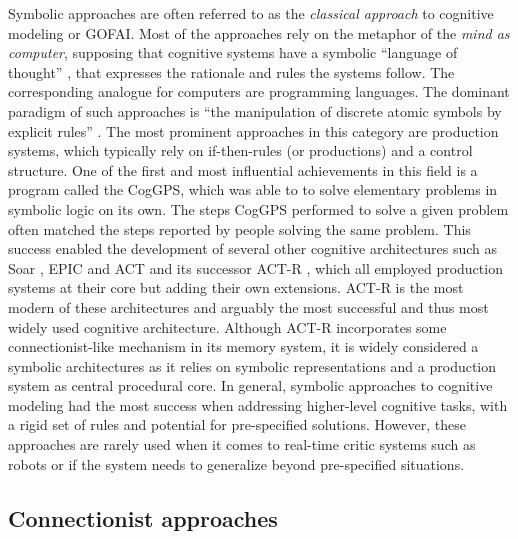 Symbolic approaches are often referred to as the \emph{classical approach} to cognitive modeling or \acf{GOFAI}.
Most of the approaches rely on the metaphor of the \emph{mind as computer}, supposing that cognitive systems have a symbolic \enquote{language of thought} \parencite{Fodor1975}, that expresses the rationale and rules the systems follow.
The corresponding analogue for computers are programming languages.
The dominant paradigm of such approaches is \enquote{the manipulation of discrete atomic symbols by explicit rules} \parencite{Levy2008}.
The most prominent approaches in this category are production systems, which typically rely on if-then-rules (or productions) and a control structure.
One of the first and most influential achievements in this field is a program called the \ac{CogGPS}, which was able to to solve elementary problems in symbolic logic on its own.
The steps \ac{CogGPS} performed to solve a given problem often matched the steps reported by people solving the same problem.
This success enabled the development of several other cognitive architectures such as Soar \parencite{Laird1987}, \ac{EPIC} \parencite{Kieras1997} and \ac{ACT} \parencite{Anderson1983} and its successor \ac{ACT-R} \parencite{Anderson1996}, which all employed production systems at their core but adding their own extensions.
\ac{ACT-R} is the most modern of these architectures and arguably the most successful and thus most widely used cognitive architecture.
Although \ac{ACT-R} incorporates some connectionist-like mechanism in its memory system, it is widely considered a symbolic architectures as it relies on symbolic representations and a production system as central procedural core.
In general, symbolic approaches to cognitive modeling had the most success when addressing higher-level cognitive tasks, with a rigid set of rules and potential for pre-specified solutions.
However, these approaches are rarely used when it comes to real-time critic systems such as robots or if the system needs to generalize beyond pre-specified situations.

\subsection{Connectionist approaches}%
\label{subsec:connectionist_approaches}

